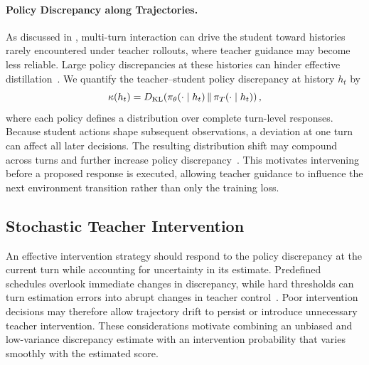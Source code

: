 \paragraph{Policy Discrepancy along Trajectories.}
As discussed in , multi-turn interaction can drive the student toward histories rarely encountered under teacher rollouts, where teacher guidance may become less reliable.
Large policy discrepancies at these histories can hinder effective distillation~\citep{abs-2604-13016}.
We quantify the teacher--student policy discrepancy at history $h_t$ by
\begin{equation}
    \setlength\abovedisplayskip{1.3pt}
    \setlength\belowdisplayskip{1.3pt}
    \kappa(h_t)
    =
    D_{\mathrm{KL}}\!\left(
        \pi_\theta(\cdot\mid h_t)
        \,\|\,
        \pi_T(\cdot\mid h_t)
    \right),
    \label{eq:instantaneous_kl}
\end{equation}
where each policy defines a distribution over complete turn-level responses.
Because student actions shape subsequent observations, a deviation at one turn can affect all later decisions.
The resulting distribution shift may compound across turns and further increase policy discrepancy~\citep{abs-2604-24005,abs-2606-15912}.
This motivates intervening before a proposed response is executed, allowing teacher guidance to influence the next environment transition rather than only the training loss.


\subsection{Stochastic Teacher Intervention}
\label{sec:stochastic_teacher_intervention}

An effective intervention strategy should respond to the policy discrepancy at the current turn while accounting for uncertainty in its estimate.
Predefined schedules overlook immediate changes in discrepancy, while hard thresholds can turn estimation errors into abrupt changes in teacher control~\citep{abs-2606-15912,abs-2604-24005}.
Poor intervention decisions may therefore allow trajectory drift to persist or introduce unnecessary teacher intervention.
These considerations motivate combining an unbiased and low-variance discrepancy estimate with an intervention probability that varies smoothly with the estimated score.

 \vspace{-0.5em}
